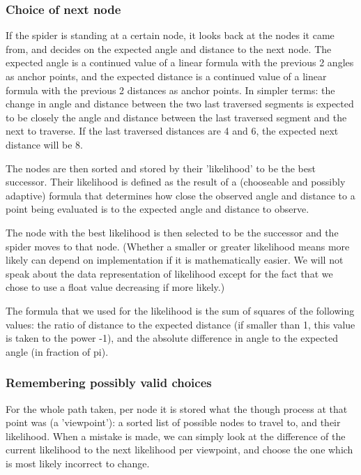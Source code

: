 \documentclass[11pt]{article}
\begin{document}
\subsubsection{Choice of next node} 

If the spider is standing at a certain node, it looks back at the nodes it came from, and decides on the expected angle and distance to the next node. The expected angle is a continued value of a linear formula with the previous 2 angles as anchor points, and the expected distance is a continued value of a linear formula with the previous 2 distances as anchor points. In simpler terms: the change in angle and distance between the two last traversed segments is expected to be closely the angle and distance between the last traversed segment and the next to traverse. If the last traversed distances are 4 and 6, the expected next distance will be 8.

The nodes are then sorted and stored by their 'likelihood' to be the best successor. Their likelihood is defined as the result of a (chooseable and possibly adaptive) formula that determines how close the observed angle and distance to a point being evaluated is to the expected angle and distance to observe.

The node with the best likelihood is then selected to be the successor and the spider moves to that node. (Whether a smaller or greater likelihood means more likely can depend on implementation if it is mathematically easier. We will not speak about the data representation of likelihood except for the fact that we chose to use a float value decreasing if more likely.)

The formula that we used for the likelihood is the sum of squares of the following values: the ratio of distance to the expected distance (if smaller than 1, this value is taken to the power -1), and the absolute difference in angle to the expected angle (in fraction of pi).

\subsubsection{Remembering possibly valid choices} 

For the whole path taken, per node it is stored what the though process at that point was (a 'viewpoint'): a sorted list of possible nodes to travel to, and their likelihood. When a mistake is made, we can simply look at the difference of the current likelihood to the next likelihood per viewpoint, and choose the one which is most likely incorrect to change.
\end{document}
